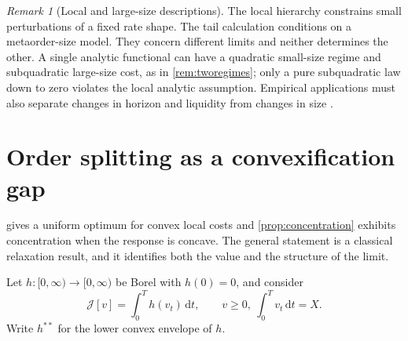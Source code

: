 \documentclass[11pt]{article}
\numberwithin{equation}{section}
\theoremstyle{definition}
\theoremstyle{remark}
\newtheorem{remark}[theorem]{Remark}
\theoremstyle{definition}
\newcommand{\dd}{\,\mathrm d}
\begin{document}
\begin{remark}[Local and large-size descriptions]
The local hierarchy constrains small perturbations of a fixed rate shape. The
tail calculation conditions on a metaorder-size model. They concern different
limits and neither determines the other. A single analytic functional can
have a quadratic small-size regime and subquadratic large-size cost, as in
\cref{rem:tworegimes}; only a pure subquadratic law down to zero violates
the local analytic assumption. Empirical applications must also separate
changes in horizon and liquidity from changes in size
\citep{lilloFarmer2004,bouchaud2018}.
\end{remark}

\section{Order splitting as a convexification gap}\label{sec:relaxation}

 gives a uniform optimum for convex local costs and
\cref{prop:concentration} exhibits concentration when the response is concave.
The general statement is a classical relaxation result, and it identifies both
the value and the structure of the limit.

Let $h:[0,\infty)\to[0,\infty)$ be Borel with $h(0)=0$, and consider
\begin{equation}\label{eq:localprob}
 \mathcal J[v]=\int_0^Th(v_t)\dd t,\qquad v\geq0,\ \int_0^Tv_t\dd t=X .
\end{equation}
Write $h^{**}$ for the lower convex envelope of $h$.
\end{document}
